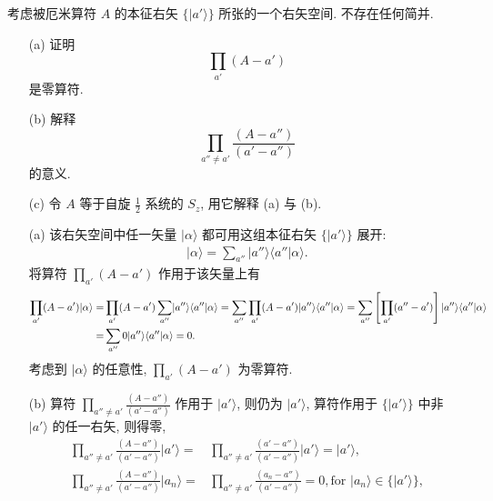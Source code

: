 \documentclass{assignment}
\begin{document}
\begin{prob}[课本习题 1.8]
    考虑被厄米算符 $A$ 的本征右矢 $\{\lvert a'\rangle\}$ 所张的一个右矢空间. 不存在任何简并.
    \begin{itemize}
        \item[(a)] 证明
        \[
            \prod_{a'}(A-a')
        \]
        是零算符.
        \item[(b)] 解释
        \[
            \prod_{a''\neq a'}\frac{(A-a'')}{(a'-a'')}
        \]
        的意义.
        \item[(c)] 令 $A$ 等于自旋 $\frac{1}{2}$ 系统的 $S_z$, 用它解释 (a) 与 (b).
    \end{itemize}
\end{prob}
\begin{sol}
    \begin{itemize}
        \item[(a)] 该右矢空间中任一矢量 $\lvert\alpha\rangle$ 都可用这组本征右矢 $\{\lvert a'\rangle\}$ 展开:
        \begin{align}
            \lvert\alpha\rangle=\sum_{a''}\lvert a''\rangle\langle a''\vert \alpha\rangle.
        \end{align}
        将算符 $\prod_{a'}(A-a')$ 作用于该矢量上有
        \begin{align}
            \notag\prod_{a'}(A-a')\lvert\alpha\rangle=&\prod_{a'}(A-a')\sum_{a''}\lvert a''\rangle\langle a''\vert\alpha\rangle=\sum_{a''}\prod_{a'}(A-a')\lvert a''\rangle\langle a''\vert\alpha\rangle=\sum_{a''}\left[\prod_{a'}(a''-a')\right]\lvert a''\rangle\langle a''\vert\alpha\rangle\\
            =&\sum_{a''}0\lvert a''\rangle\langle a''\vert\alpha\rangle=0.
        \end{align}
        考虑到 $\lvert\alpha\rangle$ 的任意性, $\prod_{a'}(A-a')$ 为零算符.
        \item[(b)] 算符 $\prod_{a''\neq a'}\frac{(A-a'')}{(a'-a'')}$ 作用于 $\lvert a'\rangle$, 则仍为 $\lvert a'\rangle$, 算符作用于 $\{\lvert a'\rangle\}$ 中非 $\lvert a'\rangle$ 的任一右矢, 则得零,
        \begin{align}
            \prod_{a''\neq a'}\frac{(A-a'')}{(a'-a'')}\lvert a'\rangle=&\prod_{a''\neq a'}\frac{(a'-a'')}{(a'-a'')}\lvert a'\rangle=\lvert a'\rangle,\\
            \prod_{a''\neq a'}\frac{(A-a'')}{(a'-a'')}\lvert a_n\rangle=&\prod_{a''\neq a'}\frac{(a_n-a'')}{(a'-a'')}=0,\text{for }\lvert a_n\rangle\in\{\lvert a'\rangle\},
        \end{align}

\end{itemize}
\end{sol}
\end{document}
